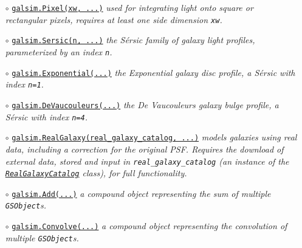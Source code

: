 \documentclass[preprint,11pt]{aastex}
\begin{document}
\begin{itemize}
{  optional obscuration.}
\item[$\circ$]
  \href{http://galsim-developers.github.com/GalSim/classgalsim_1_1base_1_1_pixel.html}{\texttt{galsim.Pixel(xw,
    ...)}} \newline \emph{used for integrating light onto square or
  rectangular pixels, requires at least one side dimension \texttt{xw}.}
\item[$\circ$]
  \href{http://galsim-developers.github.com/GalSim/classgalsim_1_1base_1_1_sersic.html}{\texttt{galsim.Sersic(n,
    ...)}} \newline\emph{ the S\'{e}rsic family of galaxy light
  profiles, parameterized by an index \texttt{n}.}
\item[$\circ$]
  \href{http://galsim-developers.github.com/GalSim/classgalsim_1_1base_1_1_exponential.html}{\texttt{galsim.Exponential(...)}}
  \newline \emph{the Exponential galaxy disc profile, a S\'{e}rsic with index \texttt{n=1}.}
\item[$\circ$]
  \href{http://galsim-developers.github.com/GalSim/classgalsim_1_1base_1_1_de_vaucouleurs.html}{\texttt{galsim.DeVaucouleurs(...)}}
  \newline \emph{the De Vaucouleurs galaxy bulge profile, a S\'{e}rsic with index \texttt{n=4}.}
\item[$\circ$]
  \href{http://galsim-developers.github.com/GalSim/classgalsim_1_1base_1_1_real_galaxy.html}{\texttt{galsim.RealGalaxy(real\_galaxy\_catalog,
      ...)}} \newline \emph{models galaxies using real
  data, including a correction for the original PSF.  Requires the
  download of external data, stored and input in \texttt{real\_galaxy\_catalog} (an instance of the
  \href{http://galsim-developers.github.com/GalSim/classgalsim_1_1real_1_1_real_galaxy_catalog.html}{\texttt{RealGalaxyCatalog}}
  class), for full functionality.}
\item[$\circ$]
  \href{http://galsim-developers.github.com/GalSim/classgalsim_1_1base_1_1_add.html}{\texttt{galsim.Add(...)}}
  \newline \emph{a \emph{compound} object representing the sum of 
  multiple \texttt{GSObject}s.}
\item[$\circ$]
  \href{http://galsim-developers.github.com/GalSim/classgalsim_1_1base_1_1_convolve.html}{\texttt{galsim.Convolve(...)}}
  \newline \emph{a \emph{compound} object representing the convolution of 
multiple \texttt{GSObject}s.}
\end{itemize}
\end{document}
